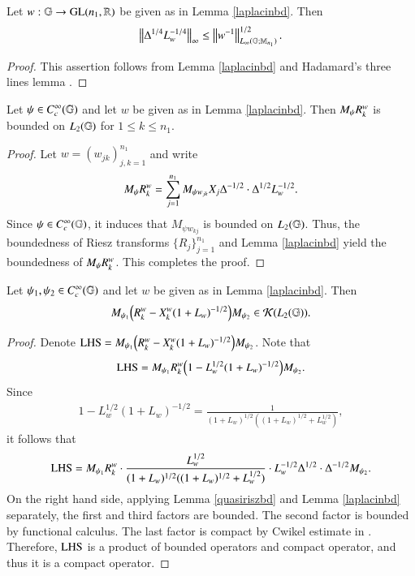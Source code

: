 \documentclass[leqno]{amsart}
\begin{document}
	
	\begin{lemma}\label{laplacian-bd-14}
		Let $w:\mathbb{G}\rightarrow{\rm GL}(n_{1},\mathbb{R})$ be given as in Lemma \ref{laplacinbd}. Then
		$$\left\| \Delta^{1/4}L_{w}^{-1/4} \right\|_{\infty}\leq\left\| w^{-1} \right\|_{L_{\infty}(\mathbb{G};\mathbb{M}_{n_{1}})}^{1/2}.$$
	\end{lemma}
	\begin{proof}
		This assertion follows from Lemma \ref{laplacinbd} and Hadamard's three lines lemma \cite[Lem 1.3.5]{G2014c}.
	\end{proof}
	
	
	\begin{lemma}\label{quasiriszbd}
		Let $\psi\in C_{c}^{\infty}(\mathbb{G})$ and let $w$ be given as in Lemma \ref{laplacinbd}. Then $M_{\psi}{ R}^{w}_{k}$ is bounded on $L_{2}(\mathbb{G})$ for $1\leq k\leq n_{1}$.
	\end{lemma}
	\begin{proof}
		Let $w=(w_{jk})_{j,k=1}^{n_{1}}$ and write
		\begin{align*}
			M_{\psi}{ R}^{w}_{k}
			=\sum_{j=1}^{n_{1}}M_{\psi w_{jk}}X_{j}\Delta^{-1/2}\cdot\Delta^{1/2}L_{w}^{-1/2}.
		\end{align*}
		Since $\psi\in C_{c}^{\infty}(\mathbb{G})$, it induces that $M_{\psi w_{kj}}$ is bounded on $L_{2}(\mathbb{G})$. Thus, the boundedness of Riesz transforms $\{ R_{j}\}_{j=1}^{n_{1}}$ and Lemma \ref{laplacinbd} yield the boundedness of $M_{\psi}{ R}^{w}_{k}$. This completes the proof.
	\end{proof}
	
	
	\begin{lemma}\label{rieszcompactt}
		Let $\psi_{1},\psi_{2}\in C_{c}^{\infty}(\mathbb{G})$ and let $w$ be given as in Lemma \ref{laplacinbd}. Then
		$$M_{\psi_{1}}\Big({ R}^{w}_{k}-X_{k}^{w}(1+L_{w})^{-1/2}\Big)M_{\psi_{2}}\in{\mathcal K}(L_{2}(\mathbb{G})).$$
	\end{lemma}
	\begin{proof}
		Denote ${\rm LHS}=M_{\psi_{1}}\Big({ R}^{w}_{k}-X_{k}^{w}(1+L_{w})^{-1/2}\Big)M_{\psi_{2}}$. Note that
		\begin{align*}
			{\rm LHS}=M_{\psi_{1}}{ R}^{w}_{k}\Big(1-L_{w}^{1/2}(1+L_{w})^{-1/2}\Big)M_{\psi_{2}}.
		\end{align*}
		Since
		\begin{align*}
			1-L_{w}^{1/2}(1+L_{w})^{-1/2}
			=\frac{1}{(1+L_{w})^{1/2}((1+L_{w})^{1/2}+L_{w}^{1/2})},
		\end{align*}
		it follows that
		\begin{align*}
			{\rm LHS}
			=M_{\psi_{1}}{ R}^{w}_{k}\cdot\frac{L_{w}^{1/2}}{(1+L_{w})^{1/2}((1+L_{w})^{1/2}+L_{w}^{1/2})}
			\cdot L_{w}^{-1/2}\Delta^{1/2}\cdot\Delta^{-1/2}M_{\psi_{2}}.
		\end{align*}
		On the right hand side,  applying Lemma \ref{quasiriszbd} and Lemma \ref{laplacinbd} separately, the first and third factors are bounded. The second factor is bounded by functional calculus. The last factor is compact by Cwikel estimate in \cite{MSZ-Cwikel}. Therefore, ${\rm LHS}$ is a product of bounded operators and compact operator, and thus it is a compact operator. 
	\end{proof}
	
\end{document}
